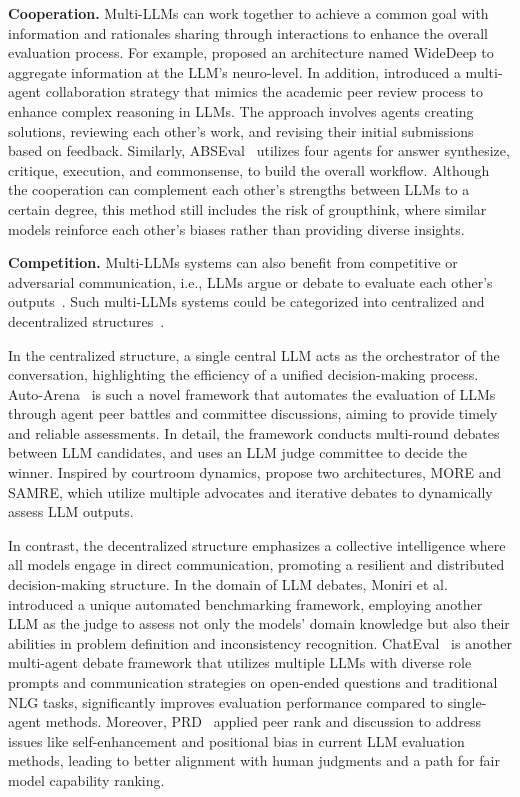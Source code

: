\textbf{Cooperation.} 
Multi-LLMs can work together to achieve a common goal with information and rationales sharing through interactions to enhance the overall evaluation process.
For example, \citet{zhang2023wider} proposed an architecture named WideDeep to aggregate information at the LLM's neuro-level.
In addition, \citet{xu2023towards} introduced a multi-agent collaboration strategy that mimics the academic peer review process to enhance complex reasoning in LLMs. 
The approach involves agents creating solutions, reviewing each other’s work, and revising their initial submissions based on feedback.
Similarly, ABSEval~\cite{liang2024abseval} utilizes four agents for answer synthesize, critique, execution, and commonsense, to build the overall workflow.
Although the cooperation can complement each other's strengths between LLMs to a certain degree, this method still includes the risk of groupthink, where similar models reinforce each other’s biases rather than providing diverse insights.


\textbf{Competition.} Multi-LLMs systems can also benefit from competitive or adversarial communication, i.e., LLMs argue or debate to evaluate each other's outputs~\cite{zhao2024auto,moniri2024evaluating,chan2023chateval,li2023prd}. 
Such multi-LLMs systems could be categorized into centralized and decentralized structures~\cite{owens2024multi}.

In the centralized structure, a single central LLM acts as the orchestrator of the conversation, highlighting the efficiency of a unified decision-making process.
Auto-Arena~\cite{zhao2024auto} is such a novel framework that automates the evaluation of LLMs through agent peer battles and committee discussions, aiming to provide timely and reliable assessments. In detail, the framework conducts multi-round debates between LLM candidates, and uses an LLM judge committee to decide the winner.
Inspired by courtroom dynamics, \citet{bandi2024adversarial} propose two architectures, MORE and SAMRE, which utilize multiple advocates and iterative debates to dynamically assess LLM outputs.

In contrast, the decentralized structure emphasizes a collective intelligence where all models engage in direct communication, promoting a resilient and distributed decision-making structure.
In the domain of LLM debates, Moniri et al.~\cite{moniri2024evaluating} introduced a unique automated benchmarking framework, employing another LLM as the judge to assess not only the models' domain knowledge but also their abilities in problem definition and inconsistency recognition.
ChatEval~\cite{chan2023chateval} is another multi-agent debate framework that utilizes multiple LLMs with diverse role prompts and communication strategies on open-ended questions and traditional NLG tasks, significantly improves evaluation performance compared to single-agent methods.
Moreover, PRD~\cite{li2023prd} applied peer rank and discussion to address issues like self-enhancement and positional bias in current LLM evaluation methods, leading to better alignment with human judgments and a path for fair model capability ranking.


